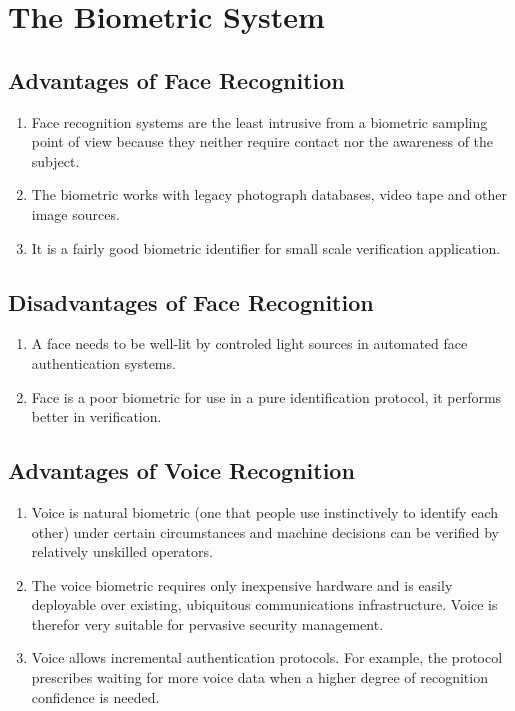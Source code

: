 \newpage



\section{The Biometric System}

\subsection{Advantages of Face Recognition}

\begin{enumerate}
  \item Face recognition systems are the least intrusive from a biometric sampling point of view because they neither require contact nor the awareness of the subject.
  \item The biometric works with legacy photograph databases, video tape and other image sources.
  \item It is a fairly good biometric identifier for small scale verification application.
\end{enumerate}

\subsection{Disadvantages of Face Recognition}

\begin{enumerate}
  \item A face needs to be well-lit by controled light sources in automated face authentication systems.
  \item Face is a poor biometric for use in a pure identification protocol, it performs better in verification.
\end{enumerate}

\subsection{Advantages of Voice Recognition}

\begin{enumerate}
  \item Voice is  natural biometric (one that people use instinctively to identify each other) under certain circumstances and machine decisions can be verified by relatively unskilled operators.
  \item The voice biometric requires only inexpensive hardware and is easily deployable over existing, ubiquitous communications infrastructure. Voice is therefor very suitable for pervasive security management.
  \item Voice allows incremental authentication protocols. For example, the protocol prescribes waiting for more voice data when a higher degree of recognition confidence is needed.
\end{enumerate}

